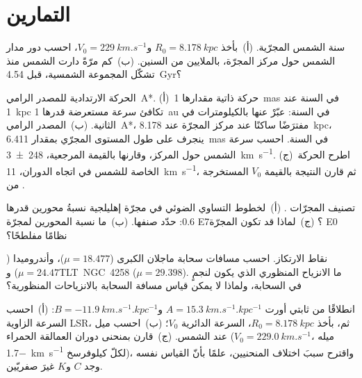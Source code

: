 \section{التمارين}

\begin{exercise}[$\star$]\label{exo:b3:milky-way-galaxies:1}
سنة الشمس المجرّية. (أ)~بأخذ $R_0 = \qty{8.178}{kpc}$
و$V_0 = \qty{229}{km.s^{-1}}$، احسب دور مدار الشمس حول
مركز المجرّة، بالملايين من السنين. (ب)~كم مرّةً دارت الشمس
منذ تشكّل المجموعة الشمسية، قبل \qty{4.54}{Gyr}؟
\end{exercise}

\begin{exercise}[$\star$]\label{exo:b3:milky-way-galaxies:2}
الحركة الارتدادية للمصدر الرامي~A*. (أ)~حركة ذاتية مقدارها \qty{1}{mas} في السنة
عند \qty{1}{kpc} تكافئ سرعة مستعرضة قدرها \qty{1}{au} في السنة: عبّرْ عنها
بالكيلومترات في الثانية. (ب)~المصدر الرامي~A*، مفترَضًا ساكنًا عند مركز المجرّة
عند \qty{8.178}{kpc}، ينجرف على طول المستوى المجرّي بمقدار \qty{6.411}{mas}
في السنة. احسب سرعة الشمس حول المركز، وقارنها بالقيمة
المرجعية، \qty[separate-uncertainty=true]{248 \pm 3}{km.s^{-1}}. (ج)~اطرح الحركة
الخاصة للشمس في اتجاه الدوران، \qty{11}{km.s^{-1}}، ثم قارن النتيجة
بالقيمة $V_0$ المستخرجة من .
\end{exercise}

\begin{exercise}[$\star$]\label{exo:b3:milky-way-galaxies:3}
تصنيف المجرّات . (أ)~لخطوط التساوي الضوئي في مجرّة إهليلجية
نسبةُ محورين قدرها 0.6: حدّد صنفها. (ب)~ما نسبة المحورين لمجرّة E7؟
(ج)~لماذا قد تكون المجرّة E0 نظامًا مفلطحًا؟
\end{exercise}

\begin{exercise}[$\star$]\label{exo:b3:milky-way-galaxies:4}
نقاط الارتكاز. احسب مسافات سحابة ماجلان الكبرى
($\mu = 18.477$)، وأندروميدا ($\mu = 24.47$) و\mbox{\textdir TLT NGC~4258}
($\mu = 29.398$). ما الانزياح المنظوري الذي يكون لنجمٍ في السحابة، ولماذا
لا يمكن قياس مسافة السحابة بالانزياحات المنظورية؟
\end{exercise}

\begin{exercise}[$\star\star$]\label{exo:b3:milky-way-galaxies:5}
انطلاقًا من ثابتي أورت $A = \qty{15.3}{km.s^{-1}.kpc^{-1}}$
و$B = \qty{-11.9}{km.s^{-1}.kpc^{-1}}$: (أ)~احسب السرعة الزاوية
 LSR، ثم، بأخذ $R_0 = \qty{8.178}{kpc}$، السرعة الدائرية $V_0$؛
(ب)~احسب ميل  عند الشمس. (ج)~قارن
بمنحنى دوران العمالقة الحمراء ($V_0 = \qty{229.0}{km.s^{-1}}$،
ميله \qty{-1.7}{km.s^{-1}} لكلّ كيلوفرسخ)، واقترح سببَ اختلاف المنحنيين،
علمًا بأنّ القياس نفسه وجد $C$ و$K$ غيرَ صفريّين.
\end{exercise}

